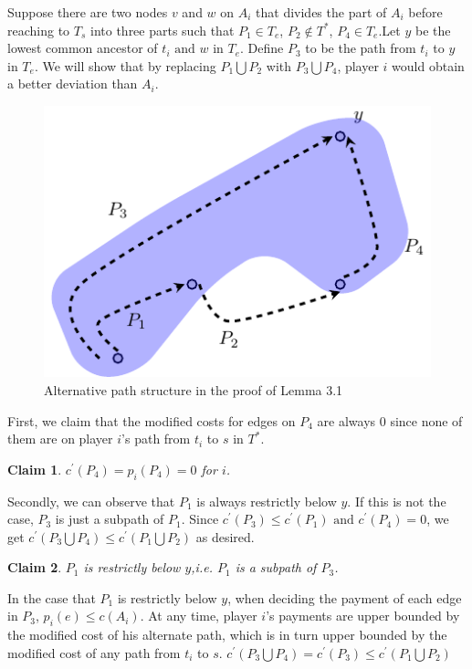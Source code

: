 \documentclass[11pt,psfig,times]{article}
\newtheorem{claim}{Claim}
\begin{document}
Suppose there are two nodes \(v\) and \(w\) on \(A_i\) that divides the part of $A_i$ before reaching to $T_s$ into three parts such that \(P_1 \in T_e\), \(P_2 \notin T^*\), \(P_4 \in T_e\).Let $y$ be the lowest common ancestor of $t_i \text{ and } w \text{ in } T_e$. Define $P_3$ to be the path from $t_i$ to $y$ in $T_e$. We will show that by replacing $P_1 \bigcup P_2$ with $P_3 \bigcup P_4$, player $i$ would obtain a better deviation than $A_i$.
		\begin{figure}			
		\begin{center}
		\includegraphics{pictures/alterpath.pdf}
		\end{center}
		\caption{Alternative path structure in the proof of Lemma 3.1}
		\label{fig:alterpath}
	\end{figure}

First, we claim that the modified costs for edges on $P_4$ are always 0 since none of them are on player $i$'s path from $t_i$ to $s$ in $T^*$.
		\begin{claim}
			$ c^{'}(P_4) = p_i(P_4) = 0$ for $i$.
		\end{claim}
Secondly, we can observe that $P_1$ is always restrictly below $y$. If this is not the case, $P_3$ is just a subpath of $P_1$. Since $c^{'}(P_3) \leq c^{'}(P_1) \text{ and } c^{'}(P_4) = 0$, we get $ c^{'}(P_3\bigcup P_4) \leq c^{'}(P_1\bigcup P_2)$ as desired.  	
		\begin{claim}
		$P_1$ is restrictly below $y$,i.e. $P_1$ is a subpath of $P_3$. 
		\end{claim}

In the case that $P_1$ is restrictly below $y$,
when deciding the payment of each edge in $P_3$, $p_i(e) \leq c(A_i)$. At any time, player $i$'s payments are upper bounded by the modified cost of his alternate path, which is in turn upper bounded by the modified cost of any path from $t_i$ to $s$. 
			 $ c^{'}(P_3\bigcup P_4) = c^{'}(P_3) \leq c^{'}(P_1\bigcup P_2)$
	
\end{document}
